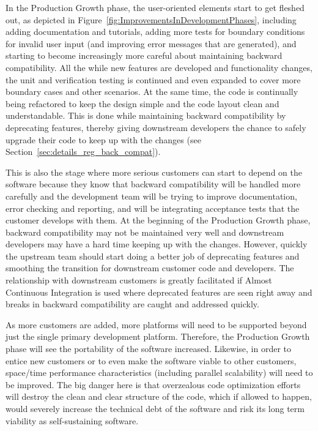 \documentclass[11pt]{SANDreport}
\begin{document}
In the Production Growth phase, the user-oriented elements start to get fleshed out, as depicted in Figure~\ref{fig:ImprovementsInDevelopmentPhases}, including adding documentation and tutorials, adding more tests for boundary conditions for invalid user input (and improving error messages that are generated), and starting to become increasingly more careful about maintaining backward compatibility.  All the while new features are developed and functionality changes, the unit and verification testing is continued and even expanded to cover more boundary cases and other scenarios.  At the same time, the code is continually being refactored to keep the design simple and the code layout clean and understandable.  This is done while maintaining backward compatibility by deprecating features, thereby giving downstream developers the chance to safely upgrade their code to keep up with the changes (see Section~\ref{sec:details_reg_back_compat}).

This is also the stage where more serious customers can start to depend on the software because they know that backward compatibility will be handled more carefully and the development team will be trying to improve documentation, error checking and reporting, and will be integrating acceptance tests that the customer develops with them.  At the beginning of the Production Growth phase, backward compatibility may not be maintained very well and downstream developers may have a hard time keeping up with the changes.  However, quickly the upstream team should start doing a better job of deprecating features and smoothing the transition for downstream customer code and developers. The relationship with downstream customers is greatly facilitated if Almost Continuous Integration {}\cite{SoftwareIntegrationforCSE09} is used where deprecated features are seen right away and breaks in backward compatibility are caught and addressed quickly.

As more customers are added, more platforms will need to be supported beyond just the single primary development platform.  Therefore, the Production Growth phase will see the portability of the software increased.  Likewise, in order to entice new customers or to even make the software viable to other customers, space/time performance characteristics (including parallel scalability) will need to be improved.  The big danger here is that overzealous code optimization efforts will destroy the clean and clear structure of the code, which if allowed to happen, would severely increase the technical debt of the software and risk its long term viability as self-sustaining software.
\end{document}
